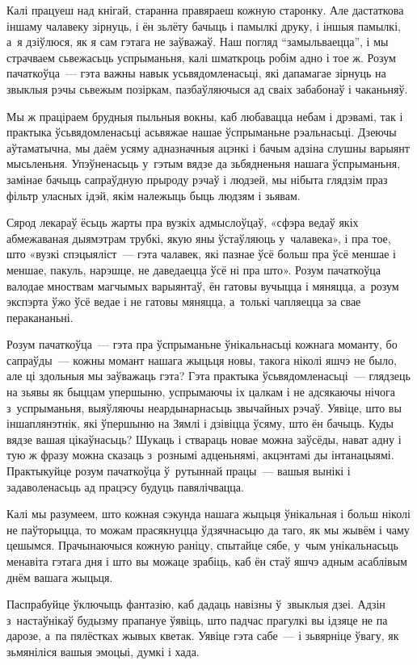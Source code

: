 Калі працуеш над кнігай, старанна правяраеш кожную старонку. Але дастаткова іншаму чалавеку зірнуць, і ён зьлёту бачыць і памылкі друку, і іншыя памылкі, а~я дзіўлюся, як я сам гэтага не заўважаў. Наш погляд ``замыльваецца'', і мы страчваем сьвежасьць успрыманьня, калі шматкроць робім адно і тое ж. Розум пачаткоўца~--- гэта важны навык усьвядомленасьці, які дапамагае зірнуць на звыклыя рэчы сьвежым позіркам, пазбаўляючыся ад сваіх забабонаў і чаканьняў.

Мы ж праціраем брудныя пыльныя вокны, каб любавацца небам і дрэвамі, так і практыка ўсьвядомленасьці асьвяжае нашае ўспрыманьне рэальнасьці. Дзеючы аўтаматычна, мы даём усяму адназначныя ацэнкі і бачым адзіна слушны варыянт мысьленьня. Упэўненасьць у~гэтым вядзе да зьбядненьня нашага ўспрыманьня, замінае бачыць сапраўдную прыроду рэчаў і людзей, мы нібыта глядзім праз фільтр уласных ідэй, якім належыць быць людзям і зьявам.

Сярод лекараў ёсьць жарты пра вузкіх адмыслоўцаў, «сфэра ведаў якіх абмежаваная дыямэтрам трубкі, якую яны ўстаўляюць у~чалавека», і пра тое, што «вузкі спэцыяліст~--- гэта чалавек, які пазнае ўсё больш пра ўсё меншае і меншае, пакуль, нарэшце, не даведаецца ўсё ні пра што». Розум пачаткоўца валодае мноствам магчымых варыянтаў, ён гатовы вучыцца і мяняцца, а~розум экспэрта ўжо ўсё ведае і не гатовы мяняцца, а~толькі чапляецца за свае перакананьні.

Розум пачаткоўца~--- гэта пра ўспрыманьне ўнікальнасьці кожнага моманту, бо сапраўды~--- кожны момант нашага жыцьця новы, такога ніколі яшчэ не было, але ці здольныя мы заўважаць гэта? Гэта практыка ўсьвядомленасьці~--- глядзець на зьявы як быццам упершыню, успрымаючы іх цалкам і не адсякаючы нічога з~успрыманьня, выяўляючы неардынарнасьць звычайных рэчаў. Уявіце, што вы іншаплянэтнік, які ўпершыню на Зямлі і дзівіцца ўсяму, што ён бачыць. Куды вядзе вашая цікаўнасьць? Шукаць і ствараць новае можна заўсёды, нават адну і тую ж фразу можна сказаць з~рознымі адценьнямі, акцэнтамі ды інтанацыямі. Практыкуйце розум пачаткоўца ў~рутыннай працы~--- вашыя вынікі і задаволенасьць ад працэсу будуць павялічвацца. 

Калі мы разумеем, што кожная сэкунда нашага жыцьця ўнікальная і больш ніколі не паўторыцца, то можам прасякнуцца ўдзячнасьцю да таго, як мы жывём і чаму цешымся. Прачынаючыся кожную раніцу, спытайце сябе, у~чым унікальнасьць менавіта гэтага дня і што вы можаце зрабіць, каб ён стаў яшчэ адным асаблівым днём вашага жыцьця.

Паспрабуйце ўключыць фантазію, каб дадаць навізны ў~звыклыя дзеі. Адзін з~настаўнікаў будызму прапануе ўявіць, што падчас прагулкі вы ідзяце не па дарозе, а~па пялёстках жывых кветак. Уявіце гэта сабе~--- і зьвярніце ўвагу, як зьмяніліся вашыя эмоцыі, думкі і хада.

